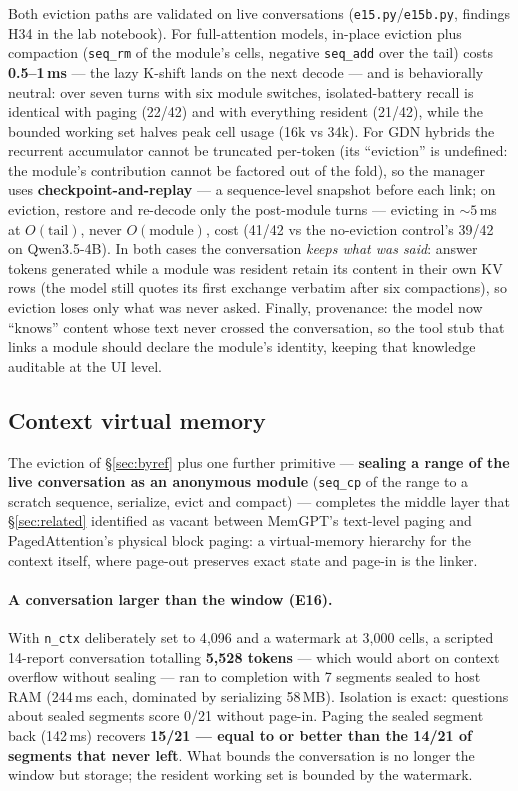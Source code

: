 \documentclass[11pt]{article}
\newcommand{\code}[1]{\texttt{#1}}
\begin{document}
Both eviction paths are validated on live conversations (\code{e15.py}/\code{e15b.py}, findings H34 in the lab notebook). For full-attention models, in-place eviction plus compaction (\code{seq\_rm} of the module's cells, negative \code{seq\_add} over the tail) costs \textbf{0.5--1\,ms} --- the lazy K-shift lands on the next decode --- and is behaviorally neutral: over seven turns with six module switches, isolated-battery recall is identical with paging (22/42) and with everything resident (21/42), while the bounded working set halves peak cell usage (16k vs 34k). For GDN hybrids the recurrent accumulator cannot be truncated per-token (its ``eviction'' is undefined: the module's contribution cannot be factored out of the fold), so the manager uses \textbf{checkpoint-and-replay} --- a sequence-level snapshot before each link; on eviction, restore and re-decode only the post-module turns --- evicting in ${\sim}5$\,ms at $O(\text{tail})$, never $O(\text{module})$, cost (41/42 vs the no-eviction control's 39/42 on Qwen3.5-4B). In both cases the conversation \emph{keeps what was said}: answer tokens generated while a module was resident retain its content in their own KV rows (the model still quotes its first exchange verbatim after six compactions), so eviction loses only what was never asked. Finally, provenance: the model now ``knows'' content whose text never crossed the conversation, so the tool stub that links a module should declare the module's identity, keeping that knowledge auditable at the UI level.

\subsection{Context virtual memory}
\label{sec:cvm}

The eviction of \S\ref{sec:byref} plus one further primitive --- \textbf{sealing a range of the live conversation as an anonymous module} (\code{seq\_cp} of the range to a scratch sequence, serialize, evict and compact) --- completes the middle layer that \S\ref{sec:related} identified as vacant between MemGPT's text-level paging and PagedAttention's physical block paging: a virtual-memory hierarchy for the context itself, where page-out preserves exact state and page-in is the linker.

\paragraph{A conversation larger than the window (E16).}
With \code{n\_ctx} deliberately set to 4{,}096 and a watermark at 3{,}000 cells, a scripted 14-report conversation totalling \textbf{5{,}528 tokens} --- which would abort on context overflow without sealing --- ran to completion with 7 segments sealed to host RAM (244\,ms each, dominated by serializing 58\,MB). Isolation is exact: questions about sealed segments score 0/21 without page-in. Paging the sealed segment back (142\,ms) recovers \textbf{15/21 --- equal to or better than the 14/21 of segments that never left}. What bounds the conversation is no longer the window but storage; the resident working set is bounded by the watermark.
\end{document}
